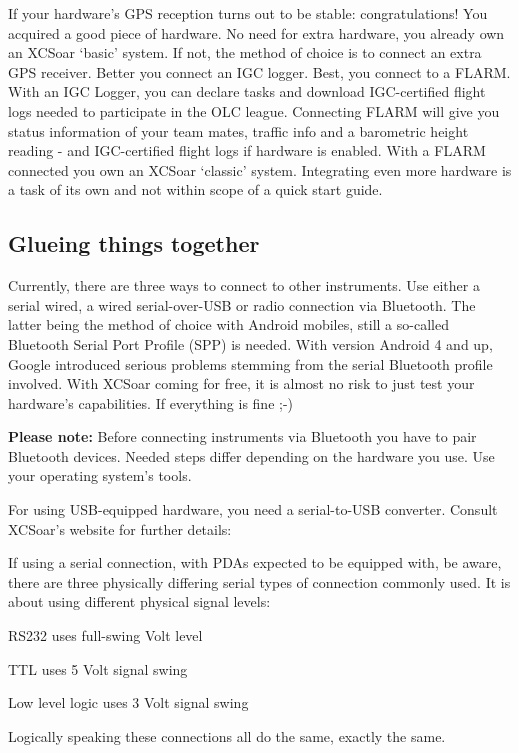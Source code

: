 \documentclass[english,a4paper,12pt]{refrep}
\begin{document}
If your hardware's GPS reception turns out to be stable: congratulations! You 
acquired a good piece of hardware. No need for extra hardware, you already own 
an XCSoar `basic' system. If not, the method of choice is to connect an extra 
GPS receiver. Better you connect an IGC logger. Best, you connect to a FLARM.
With an IGC Logger, you can declare tasks and download IGC-certified flight 
logs needed to participate in the OLC league.
Connecting FLARM will give you status information of your team mates,
traffic info and a barometric height reading - and IGC-certified flight 
logs if hardware is enabled.
With a FLARM connected you own an XCSoar `classic' system.  Integrating even
more hardware is a task of its own and not within scope of a quick start guide. 

\subsection{\textcolor{flashblue}{Glueing things together}}
Currently, there are three ways to connect to other instruments.  Use either
a serial wired, a wired serial-over-USB or radio connection via Bluetooth. The
latter being the method of choice with Android mobiles, still a so-called
Bluetooth Serial Port Profile (SPP) is needed. With version Android 4 and up,
Google introduced serious problems stemming from the serial Bluetooth profile
involved. With XCSoar coming for free, it is almost no risk to just test your 
hardware's capabilities. If everything is fine ;-)

\textbf{Please note:} Before connecting instruments via Bluetooth you have to
pair Bluetooth devices. Needed steps differ depending on the hardware you use.
Use your operating system's tools.

For using USB-equipped hardware, you need a serial-to-USB converter. Consult 
XCSoar's website for further details: {}

If using a serial connection, with PDAs expected to be equipped with, be 
aware, there are three physically differing serial types of connection 
commonly used. It is about using different physical signal levels:

\begin{compactitem}
\item RS232 uses full-swing  Volt level
\item TTL uses 5 Volt signal swing
\item Low level logic uses 3 Volt signal swing
\end{compactitem}
Logically speaking these connections all do the same, exactly the
same.
\end{document}
